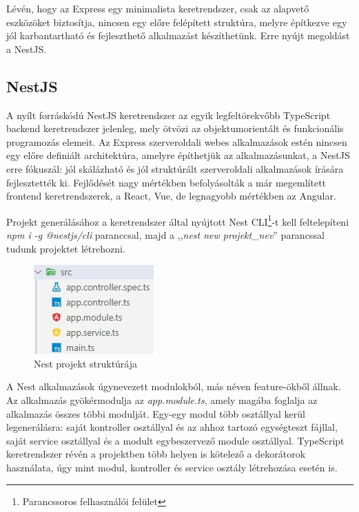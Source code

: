 \documentclass[
]{thesis-ekf}
\theoremstyle{definition}
\theoremstyle{remark}
\begin{document}
	Lévén, hogy az Express egy minimalista keretrendszer, csak az alapvető eszközöket biztosítja, nincsen egy előre felépített struktúra, melyre építkezve egy jól karbantartható és fejleszthető alkalmazást készíthetünk. Erre nyújt megoldást a NestJS.
	
	\subsection[NestJS]{NestJS\cite{nestdocs}}\label{subs:nest}
	A nyílt forráskódú NestJS keretrendszer az egyik legfeltörekvőbb TypeScript backend keretrendszer jelenleg, mely ötvözi az objektumorientált és funkcionális programozás elemeit. Az Express szerveroldali webes alkalmazások estén nincsen egy előre definiált architektúra, amelyre építhetjük az alkalmazásunkat, a NestJS erre fókuszál: jól skálázható és jól struktúrált szerveroldali alkalmazások írására fejlesztették ki.  Fejlődését nagy mértékben befolyásolták a már megemlített frontend keretrendszerek, a React, Vue, de legnagyobb mértékben az Angular.
	
	Projekt generálásához a keretrendszer által nyújtott Nest CLI\footnote{Parancssoros felhasználói felület}-t kell feltelepíteni \emph{npm i -g @nestjs/cli} paranccsal, majd a ,,\emph{nest new projekt\_nev}'' parancssal tudunk projektet létrehozni.

	\begin{figure}[!h]
		\centering
		\includegraphics{kepek/nest_structure_light_jpg.jpg}
		\caption{Nest projekt struktúrája}
	\end{figure}
	
	A Nest alkalmazások úgynevezett modulokból, más néven feature-ökből állnak. Az alkalmazás gyökérmodulja az \emph{app.module.ts}, amely magába foglalja az alkalmazás összes többi modulját. Egy-egy modul több osztállyal kerül legenerálásra: saját kontroller osztállyal és az ahhoz tartozó egységteszt fájllal, saját service osztállyal és a modult egybeszervező module osztállyal. TypeScript keretrendszer révén a projektben több helyen is kötelező a dekorátorok használata, úgy mint modul, kontroller és service osztály létrehozása esetén is.
	
\end{document}
